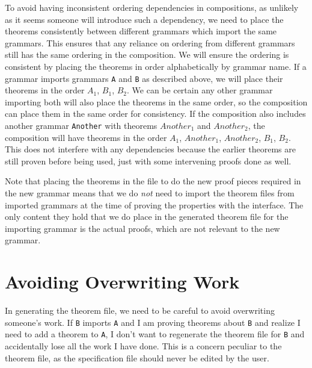 \documentclass[11pt]{article}
\newcommand{\grammar}[1]{\texttt{#1}}
\begin{document}
To avoid having inconsistent ordering dependencies in compositions, as
unlikely as it seems someone will introduce such a dependency, we need
to place the theorems consistently between different grammars which
import the same grammars.  This ensures that any reliance on ordering
from different grammars still has the same ordering in the
composition.  We will ensure the ordering is consistent by placing the
theorems in order alphabetically by grammar name.
%
If a grammar imports grammars \grammar{A} and \grammar{B} as described
above, we will place their theorems in the order $A_1$, $B_1$, $B_2$.
We can be certain any other grammar importing both will also place the
theorems in the same order, so the composition can place them in the
same order for consistency.  If the composition also includes another
grammar \grammar{Another} with theorems $Another_1$ and $Another_2$,
the composition will have theorems in the order $A_1$, $Another_1$,
$Another_2$, $B_1$, $B_2$.  This does not interfere with any
dependencies because the earlier theorems are still proven before
being used, just with some intervening proofs done as well.

Note that placing the theorems in the file to do the new proof pieces
required in the new grammar means that we do \emph{not} need to import
the theorem files from imported grammars at the time of proving the
properties with the interface.  The only content they hold that we do
place in the generated theorem file for the importing grammar is the
actual proofs, which are not relevant to the new grammar.





\section{Avoiding Overwriting Work}

In generating the theorem file, we need to be careful to avoid
overwriting someone's work.  If \grammar{B} imports \grammar{A} and I
am proving theorems about \grammar{B} and realize I need to add a
theorem to \grammar{A}, I don't want to regenerate the theorem file
for \grammar{B} and accidentally lose all the work I have done.  This
is a concern peculiar to the theorem file, as the specification file
should never be edited by the user.
\end{document}
